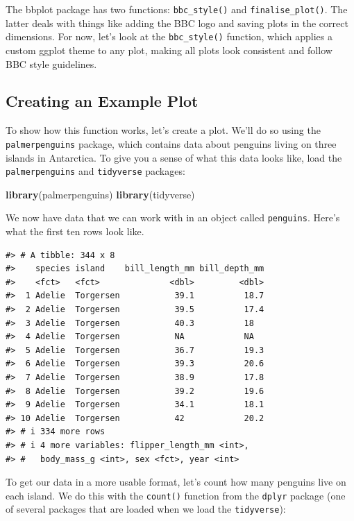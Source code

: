 \documentclass[
]{book}
\newenvironment{Shaded}{\begin{snugshade}}{\end{snugshade}}
\newcommand{\FunctionTok}[1]{\textcolor[rgb]{0.13,0.29,0.53}{\textbf{#1}}}
\newcommand{\NormalTok}[1]{#1}
\begin{document}
The bbplot package has two functions: \texttt{bbc\_style()} and \texttt{finalise\_plot()}. The latter deals with things like adding the BBC logo and saving plots in the correct dimensions. For now, let's look at the \texttt{bbc\_style()} function, which applies a custom ggplot theme to any plot, making all plots look consistent and follow BBC style guidelines.

\hypertarget{creating-an-example-plot}{%
\subsection*{Creating an Example Plot}\label{creating-an-example-plot}}

To show how this function works, let's create a plot. We'll do so using the \texttt{palmerpenguins} package, which contains data about penguins living on three islands in Antarctica. To give you a sense of what this data looks like, load the \texttt{palmerpenguins} and \texttt{tidyverse} packages:

\begin{Shaded}
\begin{Highlighting}[]
\FunctionTok{library}\NormalTok{(palmerpenguins)}
\FunctionTok{library}\NormalTok{(tidyverse)}
\end{Highlighting}
\end{Shaded}

We now have data that we can work with in an object called \texttt{penguins}. Here's what the first ten rows look like.

\begin{verbatim}
#> # A tibble: 344 x 8
#>    species island    bill_length_mm bill_depth_mm
#>    <fct>   <fct>              <dbl>         <dbl>
#>  1 Adelie  Torgersen           39.1          18.7
#>  2 Adelie  Torgersen           39.5          17.4
#>  3 Adelie  Torgersen           40.3          18  
#>  4 Adelie  Torgersen           NA            NA  
#>  5 Adelie  Torgersen           36.7          19.3
#>  6 Adelie  Torgersen           39.3          20.6
#>  7 Adelie  Torgersen           38.9          17.8
#>  8 Adelie  Torgersen           39.2          19.6
#>  9 Adelie  Torgersen           34.1          18.1
#> 10 Adelie  Torgersen           42            20.2
#> # i 334 more rows
#> # i 4 more variables: flipper_length_mm <int>,
#> #   body_mass_g <int>, sex <fct>, year <int>
\end{verbatim}

To get our data in a more usable format, let's count how many penguins live on each island. We do this with the \texttt{count()} function from the \texttt{dplyr} package (one of several packages that are loaded when we load the \texttt{tidyverse}):
\end{document}
